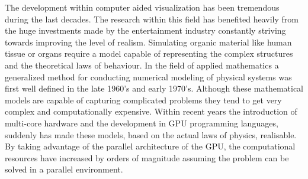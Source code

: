 %
The development within computer aided visualization has been
tremendous during the last decades. The research within this field
has benefited heavily from the huge investments made by the
entertainment industry constantly striving towards improving the level
of realism. 
%
Simulating organic material like human tissue or organs require a
model capable of representing the complex structures and
the theoretical laws of behaviour. 
%
In the field of applied mathematics a generalized method for
conducting numerical modeling of physical systems was first well
defined in the late 1960's and early 1970's. 
%
Although these mathematical models are capable of capturing
complicated problems they tend to get very complex and computationally
expensive.
%
Within recent years the introduction of multi-core hardware and the
development in GPU programming languages, suddenly has made these
models, based on the actual laws of physics, realisable. By taking
advantage of the parallel architecture of the GPU, the computational
resources have increased by orders of magnitude assuming the problem
can be solved in a parallel environment. \\

%
%

%

